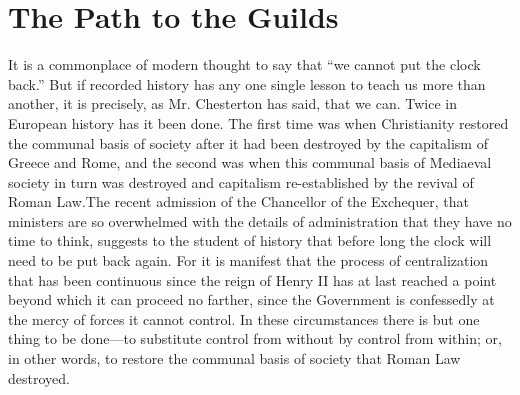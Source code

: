 \documentclass{book}
\begin{document}
\chapter{The Path to the Guilds}
\label{chapter-21}
It is a commonplace of modern thought to say that “we cannot put the clock back.” But if recorded history has any one single lesson to teach us more than another, it is precisely, as Mr. Chesterton has said, that we can. Twice in European history has it been done. The first time was when Christianity restored the communal basis of society after it had been destroyed by the capitalism of Greece and Rome, and the second was when this communal basis of Mediaeval society in turn was destroyed and capitalism re-established by the revival of Roman Law.\footnotemark[1] The recent admission of the Chancellor of the Exchequer, that ministers are so overwhelmed with the details of administration that they have no time to think, suggests to the student of history that before long the clock will need to be put back again. For it is manifest that the process of centralization that has been continuous since the reign of Henry II has at last reached a point beyond which it can proceed no farther, since the Government is confessedly at the mercy of forces it cannot control. In these circumstances there is but one thing to be done—to substitute control from without by control from within; or, in other words, to restore the communal basis of society that Roman Law destroyed.
\end{document}
